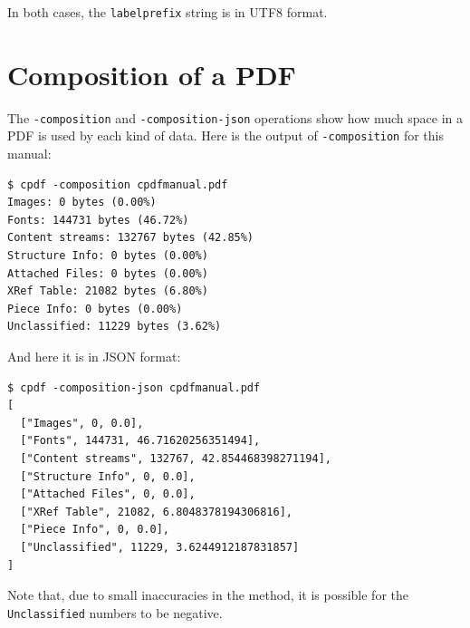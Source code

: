 \documentclass{book}
\begin{document}
\noindent In both cases, the \texttt{labelprefix} string is in UTF8 format.

\pagestyle{empty}

\section{Composition of a PDF}

The \texttt{-composition} and \texttt{-composition-json} operations show how much space in a PDF is used by each kind of data. Here is the output of \texttt{-composition} for this manual:

\begin{framed}\small\begin{verbatim}
$ cpdf -composition cpdfmanual.pdf
Images: 0 bytes (0.00%)
Fonts: 144731 bytes (46.72%)
Content streams: 132767 bytes (42.85%)
Structure Info: 0 bytes (0.00%)
Attached Files: 0 bytes (0.00%)
XRef Table: 21082 bytes (6.80%)
Piece Info: 0 bytes (0.00%)
Unclassified: 11229 bytes (3.62%)
\end{verbatim}
\end{framed}\pagestyle{empty}\thispagestyle{fancy}

\noindent And here it is in JSON format:

\begin{framed}\small\begin{verbatim}
$ cpdf -composition-json cpdfmanual.pdf
[
  ["Images", 0, 0.0],
  ["Fonts", 144731, 46.71620256351494],
  ["Content streams", 132767, 42.854468398271194],
  ["Structure Info", 0, 0.0],
  ["Attached Files", 0, 0.0],
  ["XRef Table", 21082, 6.8048378194306816],
  ["Piece Info", 0, 0.0],
  ["Unclassified", 11229, 3.6244912187831857]
]
\end{verbatim}
\end{framed}\pagestyle{empty}\thispagestyle{fancy}

\noindent Note that, due to small inaccuracies in the method, it is possible for the \texttt{Unclassified} numbers to be negative.
\end{document}
